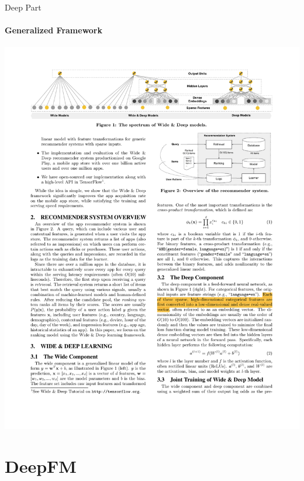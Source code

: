 \documentclass{ctexbeamer}
\begin{document}
\begin{frame}{Deep Part}
	\framesubtitle{Generalized Framework}
	\begin{center}
		\includegraphics[width=\textwidth]{framework/deep}
	\end{center}
\end{frame}

\section{DeepFM}
\end{document}
